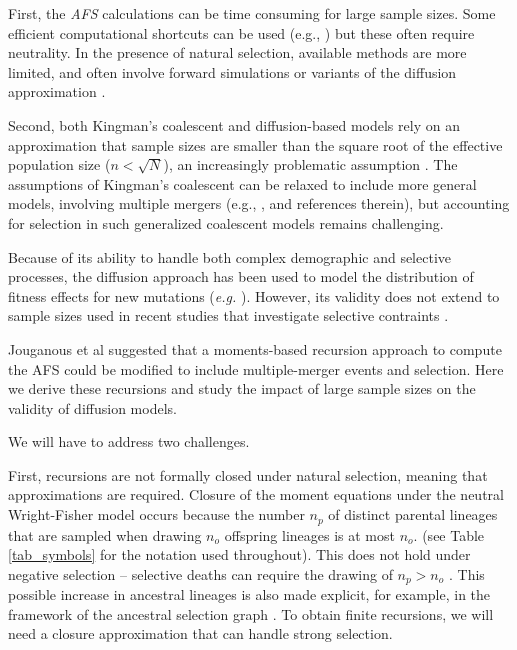 \documentclass[review,nonatbib]{elsarticle}
\begin{document}
First, the \textit{AFS} calculations can be time consuming for large sample sizes.  Some efficient
computational shortcuts can be used (e.g., \citep{fastsimcoal2, KammEtAl2017}) but these often
require neutrality.  In the presence of natural selection, available methods are more limited, and
often involve forward simulations or variants of the diffusion
approximation \citep{GutenkunstEtAl2009, JouganousEtAl2017}.

Second, both Kingman's coalescent and diffusion-based models rely on an approximation that sample
sizes are smaller than the square root of the effective population size ($n < \sqrt{N}$), an increasingly
problematic assumption \citep{Fu2006, BhaskarEtAl2014}. The assumptions of Kingman's coalescent can
be relaxed to include more general models, involving multiple mergers (e.g., \cite{Fu2006,
Spence2016}, and references therein), but accounting for selection in such generalized coalescent models 
remains challenging.

Because of its ability to handle both complex demographic and selective processes, the diffusion approach 
has been used to model the distribution of fitness effects for new
mutations (\textit{e.g.} \cite{EyreWalker2006, Boyko2009, Gutenkunst}). However, its validity does not extend to 
sample sizes used in recent studies that investigate selective contraints \cite{karczewski2020mutational}.

Jouganous et al \cite{JouganousEtAl2017} suggested that a moments-based recursion approach to compute the AFS
could be modified to include multiple-merger events and selection. 
Here we derive these recursions and study the impact of large sample sizes on the validity of diffusion models. 

We will have to address two challenges. 

First, recursions are not formally closed under natural selection, meaning that approximations are required. 
Closure of the moment equations under the neutral
Wright-Fisher model occurs because the number $n_p$ of distinct parental lineages that are sampled
when drawing $n_o$ offspring lineages is at most $n_o.$ (see Table \ref{tab_symbols}
for the notation used throughout). This does not hold under negative selection -- selective deaths can require
the drawing of $n_p>n_o$  \citep{DonnellyKurtz1999a, JouganousEtAl2017}. This possible increase 
in ancestral lineages is also made explicit, for example, in the framework of the ancestral selection graph
\citep{KroneNeuhauser1997}. To obtain finite recursions, we will need a closure approximation that can 
handle strong selection. 
\end{document}
